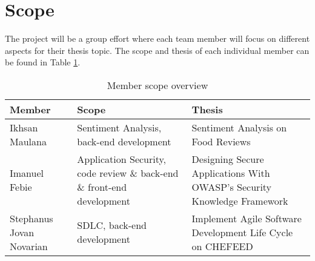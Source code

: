 \section{Scope}
The project will be a group effort  where each team member will focus on different aspects for their thesis topic. The scope and thesis of each individual member can be found in Table \ref{tab:member-scope}. 

\begin{table}[b]
    \centering
    \caption{Member scope overview}\label{tab:member-scope}
    \begin{tabular}{|l|p{10em}|p{12em}|}
        \hline
        \textbf{Member} & \textbf{Scope} & \textbf{Thesis} \\
        \hline
        Ikhsan Maulana & Sentiment Analysis, back-end development & Sentiment Analysis on Food Reviews \\
        \hline
        Imanuel Febie & Application Security, code review \& back-end \& front-end development & Designing Secure Applications With OWASP's Security Knowledge Framework\\
        \hline
        Stephanus Jovan Novarian & SDLC, back-end development & Implement Agile Software Development Life Cycle on CHEFEED \\
        \hline
    \end{tabular}
\end{table}



